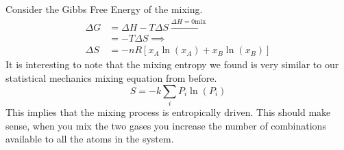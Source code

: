 \documentclass{article}
\begin{document}
Consider the Gibbs Free Energy of the mixing. 
\begin{equation}
    \begin{split}
        \Delta G &= \Delta H - T\Delta S \xrightarrow{\Delta H = 0 \text{mix}}\\
        &= -T\Delta S \implies \\
        \Delta S &= -nR\left[x_A\ln(x_A) + x_B\ln(x_B)\right]
    \end{split}
\end{equation}
It is interesting to note that the mixing entropy we found is very similar to our statistical mechanics mixing equation from before.
\begin{equation}
    S = -k\sum_iP_i\ln(P_i)
\end{equation}
This implies that the mixing process is entropically driven.
This should make sense, when you mix the two gases you increase the number of combinations available to all the atoms in the system. 
\end{document}
